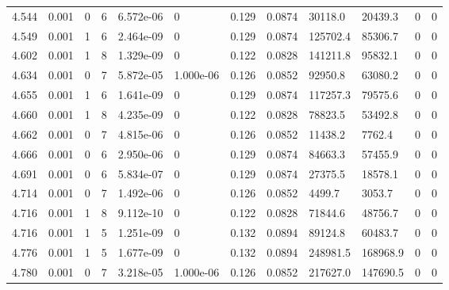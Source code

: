 \documentclass[preview]{standalone}
\begin{document}
{{{{{\begin{tabular}{L{1.2cm}C{1.2cm} C{0.3cm}C{0.5cm} C{1.4cm}C{1.4cm} C{1.4cm}C{1.4cm} C{1.6cm}C{1.6cm} C{1.6cm}C{1.6cm}}
  4.544  &  0.001  & 0     &  6 &  6.572e-06  & 0  &  0.129&   0.0874& 30118.0 & 20439.3   &  0 & 0  \\ 
  4.549  &  0.001  & 1     &  6 &  2.464e-09  & 0  &  0.129&   0.0874& 125702.4 & 85306.7   &  0 & 0  \\ 
  4.602  &  0.001  & 1     &  8 &  1.329e-09  & 0  &  0.122&   0.0828& 141211.8 & 95832.1   &  0 & 0  \\ 
  4.634  &  0.001  & 0     &  7 &  5.872e-05  & 1.000e-06  &  0.126&   0.0852& 92950.8 & 63080.2   &  0 & 0  \\ 
  4.655  &  0.001  & 1     &  6 &  1.641e-09  & 0  &  0.129&   0.0874& 117257.3 & 79575.6   &  0 & 0  \\ 
  4.660  &  0.001  & 1     &  8 &  4.235e-09  & 0  &  0.122&   0.0828& 78823.5 & 53492.8   &  0 & 0  \\ 
  4.662  &  0.001  & 0     &  7 &  4.815e-06  & 0  &  0.126&   0.0852& 11438.2 & 7762.4   &  0 & 0  \\ 
  4.666  &  0.001  & 0     &  6 &  2.950e-06  & 0  &  0.129&   0.0874& 84663.3 & 57455.9   &  0 & 0  \\ 
  4.691  &  0.001  & 0     &  6 &  5.834e-07  & 0  &  0.129&   0.0874& 27375.5 & 18578.1   &  0 & 0  \\ 
  4.714  &  0.001  & 0     &  7 &  1.492e-06  & 0  &  0.126&   0.0852& 4499.7 & 3053.7   &  0 & 0  \\ 
  4.716  &  0.001  & 1     &  8 &  9.112e-10  & 0  &  0.122&   0.0828& 71844.6 & 48756.7   &  0 & 0  \\ 
  4.716  &  0.001  & 1     &  5 &  1.251e-09  & 0  &  0.132&   0.0894& 89124.8 & 60483.7   &  0 & 0  \\ 
  4.776  &  0.001  & 1     &  5 &  1.677e-09  & 0  &  0.132&   0.0894& 248981.5 & 168968.9   &  0 & 0  \\ 
  4.780  &  0.001  & 0     &  7 &  3.218e-05  & 1.000e-06  &  0.126&   0.0852& 217627.0 & 147690.5   &  0 & 0  \\ 
\hline 
\end{tabular} 

}}}}}
\end{document}
